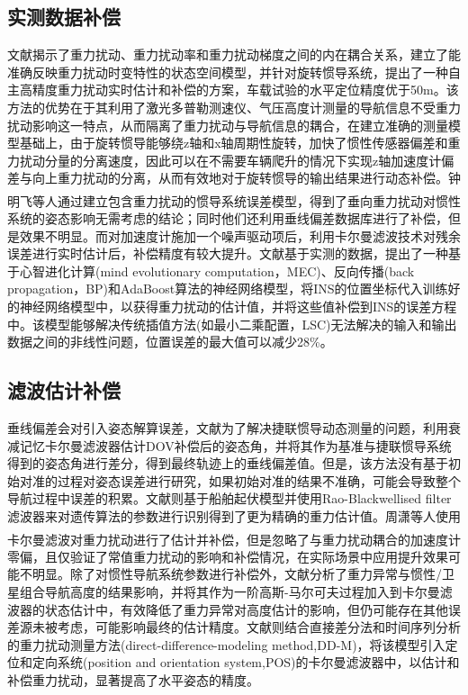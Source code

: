 \documentclass[12pt,a4,utf8]{article}
\newcommand{\upcite}[1]{\textsuperscript{\textsuperscript{\cite{#1}}}} %
\begin{document}
\subsection{实测数据补偿}
文献\cite{yang2024autonomous}揭示了重力扰动、重力扰动率和重力扰动梯度之间的内在耦合关系，建立了能准确反映重力扰动时变特性的状态空间模型，并针对旋转惯导系统，提出了一种自主高精度重力扰动实时估计和补偿的方案，车载试验的水平定位精度优于50m。该方法的优势在于其利用了激光多普勒测速仪、气压高度计测量的导航信息不受重力扰动影响这一特点，从而隔离了重力扰动与导航信息的耦合，在建立准确的测量模型基础上，由于旋转惯导能够绕z轴和x轴周期性旋转，加快了惯性传感器偏差和重力扰动分量的分离速度，因此可以在不需要车辆爬升的情况下实现z轴加速度计偏差与向上重力扰动的分离，从而有效地对于旋转惯导的输出结果进行动态补偿。钟明飞等人通过建立包含重力扰动的惯导系统误差模型\upcite{WXDH201505008015}，得到了垂向重力扰动对惯性系统的姿态影响无需考虑的结论；同时他们还利用垂线偏差数据库进行了补偿，但是效果不明显。而对加速度计施加一个噪声驱动项后，利用卡尔曼滤波技术对残余误差进行实时估计后，补偿精度有较大提升。文献\cite{zhou2016improved}基于实测的数据，提出了一种基于心智进化计算(mind evolutionary computation，MEC)、反向传播(back propagation，BP)和AdaBoost算法的神经网络模型，将INS的位置坐标代入训练好的神经网络模型中，以获得重力扰动的估计值，并将这些值补偿到INS的误差方程中。该模型能够解决传统插值方法(如最小二乘配置，LSC)无法解决的输入和输出数据之间的非线性问题，位置误差的最大值可以减少28\%。

\subsection{滤波估计补偿}
垂线偏差会对引入姿态解算误差，文献\cite{an2021method}为了解决捷联惯导动态测量的问题，利用衰减记忆卡尔曼滤波器估计DOV补偿后的姿态角，并将其作为基准与捷联惯导系统得到的姿态角进行差分，得到最终轨迹上的垂线偏差值。但是，该方法没有基于初始对准的过程对姿态误差进行研究，如果初始对准的结果不准确，可能会导致整个导航过程中误差的积累。文献\cite{stepanov2020algorithms}则基于船舶起伏模型并使用Rao-Blackwellised filter滤波器来对遗传算法的参数进行识别得到了更为精确的重力估计值。周潇等人使用卡尔曼滤波对重力扰动进行了估计并补偿\upcite{ZGXJ201506005}，但是忽略了与重力扰动耦合的加速度计零偏，且仅验证了常值重力扰动的影响和补偿情况，在实际场景中应用提升效果可能不明显。除了对惯性导航系统参数进行补偿外，文献\cite{xiong2018analysis}分析了重力异常与惯性/卫星组合导航高度的结果影响，并将其作为一阶高斯-马尔可夫过程加入到卡尔曼滤波器的状态估计中，有效降低了重力异常对高度估计的影响，但仍可能存在其他误差源未被考虑，可能影响最终的估计精度。文献\cite{fang2013accurate}则结合直接差分法和时间序列分析的重力扰动测量方法(direct-difference-modeling method,DD-M)，将该模型引入定位和定向系统(position and orientation system,POS)的卡尔曼滤波器中，以估计和补偿重力扰动，显著提高了水平姿态的精度。
\end{document}
